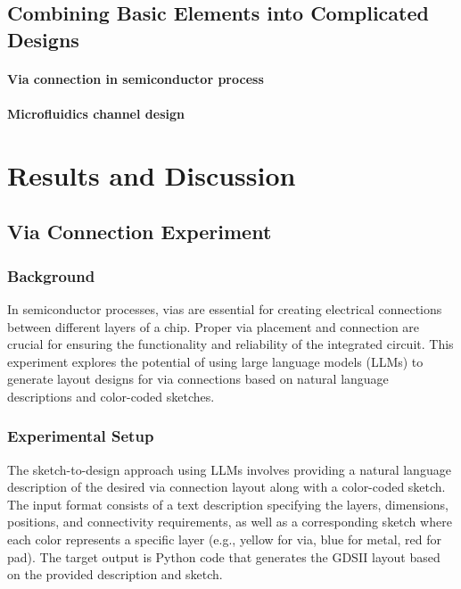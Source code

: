 \documentclass{article}
\begin{document}
\subsection{Combining Basic Elements into Complicated Designs}
\paragraph{Via connection in semiconductor process}
\paragraph{Microfluidics channel design}


\section{Results and Discussion}
\subsection{Via Connection Experiment}
\subsubsection{Background}
In semiconductor processes, vias are essential for creating electrical connections between different layers of a chip. Proper via placement and connection are crucial for ensuring the functionality and reliability of the integrated circuit. This experiment explores the potential of using large language models (LLMs) to generate layout designs for via connections based on natural language descriptions and color-coded sketches.
\subsubsection{Experimental Setup}
The sketch-to-design approach using LLMs involves providing a natural language description of the desired via connection layout along with a color-coded sketch. The input format consists of a text description specifying the layers, dimensions, positions, and connectivity requirements, as well as a corresponding sketch where each color represents a specific layer (e.g., yellow for via, blue for metal, red for pad). The target output is Python code that generates the GDSII layout based on the provided description and sketch.
\end{document}
